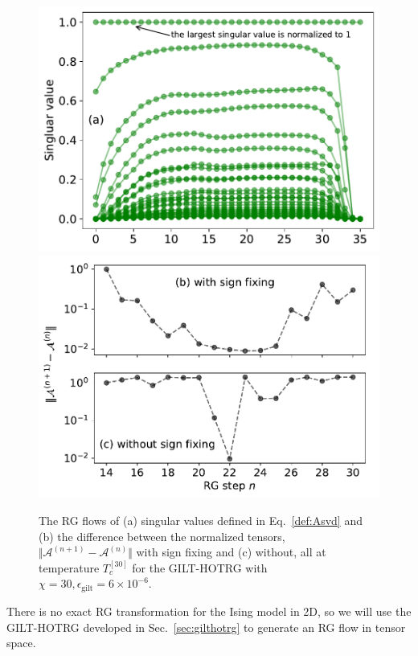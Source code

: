 \documentclass[aps,prr,reprint,superscriptaddress,floatfix]{revtex4-2}
\begin{document}
\begin{figure}[tb]
    \includegraphics[width=\columnwidth]{./figures/flowA-singVal.pdf}
    \includegraphics[width=\columnwidth]{./figures/flowA-diff-compare.pdf}
    \caption{\label{fig:flowA}
        The RG flows of (a) singular values defined in Eq.~\eqref{def:Asvd} and (b) the difference between the normalized tensors, $\Vert \mathcal{A}^{(n+1)} - \mathcal{A}^{(n)} \Vert$ with sign fixing and (c) without, all at temperature $T_c^{[30]}$ for the GILT-HOTRG with $\chi = 30, \epsilon_{\text{gilt}} = 6\times 10^{-6}$.
    }
\end{figure}
%
There is no exact RG transformation for the Ising model in 2D, so we will use the GILT-HOTRG developed in Sec.~\ref{sec:gilthotrg} to generate an RG flow in tensor space. 
\end{document}

